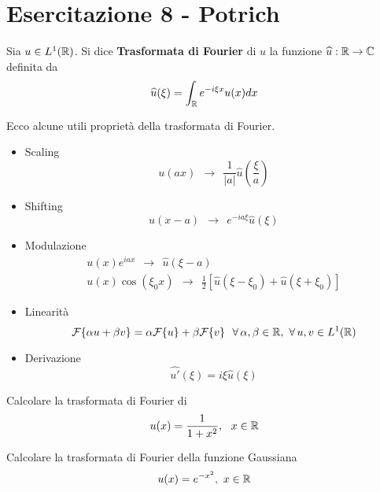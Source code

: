 \chapter{Esercitazione 8 - Potrich}
\ParteEsercizi
\begin{defn}
Sia $u\in L^{1}(\mathbb{R})$. Si dice \textbf{Trasformata di Fourier} di $u$ la funzione $\widehat{u} :\mathbb{R} \rightarrow \mathbb{C} $ definita da
\begin{equation*}
\widehat{u}(\xi) = \int_{\mathbb{R}} e^{- i\xi x} u(x) dx
\end{equation*}
\end{defn}
\begin{thm}
[Proprietà] Ecco alcune utili proprietà della trasformata di Fourier.
\begin{itemize}
\item Scaling
\begin{equation*}
u(ax) \ \ \rightarrow \ \ \frac{1}{| a|}\hat{u}\left(\frac{\xi}{a}\right)
\end{equation*}
\item Shifting
\begin{equation*}
u(x - a) \ \ \rightarrow \ \ e^{- ia\xi}\hat{u}(\xi)
\end{equation*}
\item Modulazione
\begin{gather*}
u(x) e^{iax} \ \ \rightarrow \ \ \hat{u}(\xi - a)\\
u(x)\cos(\xi_{0} x) \ \ \rightarrow \ \ \frac{1}{2}[\hat{u}(\xi - \xi_{0}) + \hat{u}(\xi + \xi_{0})]
\end{gather*}
\item Linearità
\begin{equation*}
\Fc \{\alpha u + \beta v\} = \alpha \Fc \{u\} + \beta \Fc \{v\} \ \ \forall \alpha, \beta \in \RR, \ \forall u, v\in L^{1}(\RR)
\end{equation*}
\item Derivazione
\begin{equation*}
\widehat{u'}(\xi) = i\xi \hat{u}(\xi)
\end{equation*}
\end{itemize}
\end{thm}

Calcolare la trasformata di Fourier di
\begin{equation*}
u(x) = \frac{1}{1 + x^{2}}, \ \ x\in \mathbb{R}
\end{equation*}

Calcolare la trasformata di Fourier della funzione Gaussiana
\begin{equation*}
u(x) = e^{- x^{2}}, \ x\in \mathbb{R}
\end{equation*}
\Esercizio{}

